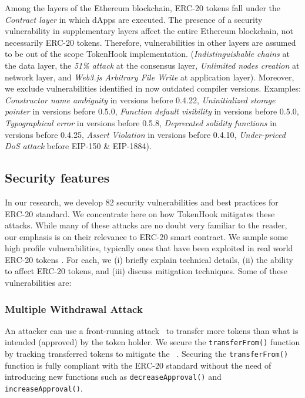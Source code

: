 Among the layers of the Ethereum blockchain, ERC-20 tokens fall under the \textit{Contract layer} in which dApps are executed. The presence of a security vulnerability in supplementary layers affect the entire Ethereum blockchain, not necessarily ERC-20 tokens. Therefore, vulnerabilities in other layers are assumed to be out of the scope TokenHook implementation. (\eg \textit{Indistinguishable chains} at the data layer, the \textit{51\% attack} at the consensus layer, \textit{Unlimited nodes creation} at network layer, and \textit{Web3.js Arbitrary File Write} at application layer). Moreover, we exclude vulnerabilities identified in now outdated compiler versions. Examples: \textit{Constructor name ambiguity} in versions before 0.4.22, \textit{Uninitialized storage pointer} in versions before 0.5.0, \textit{Function default visibility} in versions before 0.5.0, \textit{Typographical error} in versions before 0.5.8, \textit{Deprecated solidity functions} in versions before 0.4.25, \textit{Assert Violation} in versions before 0.4.10, \textit{Under-priced DoS attack} before EIP-150 \& EIP-1884).

\subsection{Security features}
In our research, we develop 82 security vulnerabilities and best practices for ERC-20 standard. We concentrate here on how TokenHook mitigates these attacks. While many of these attacks are no doubt very familiar to the reader, our emphasis is on their relevance to ERC-20 smart contract. We sample some high profile vulnerabilities, typically ones that have been exploited in real world ERC-20 tokens \cite{SolidtySecBlog,EthSecServ,SoliditySecCon,ConsensysSecCon,LandoKL}. For each, we (i) briefly explain technical details, (ii) the ability to affect ERC-20 tokens, and (iii) discuss mitigation techniques. Some of these vulnerabilities are:

\subsubsection{Multiple Withdrawal Attack} An attacker can use a front-running attack~\cite{OrderingAttack,eskandari2019sok} to transfer more tokens than what is intended (approved) by the token holder. We secure the \texttt{transferFrom()} function by tracking transferred tokens to mitigate the \mwa~\cite{MultipleWithdrawal}. Securing the \texttt{transferFrom()} function is fully compliant with the ERC-20 standard without the need of introducing new functions such as \texttt{decreaseApproval()} and \texttt{increaseApproval()}. 

